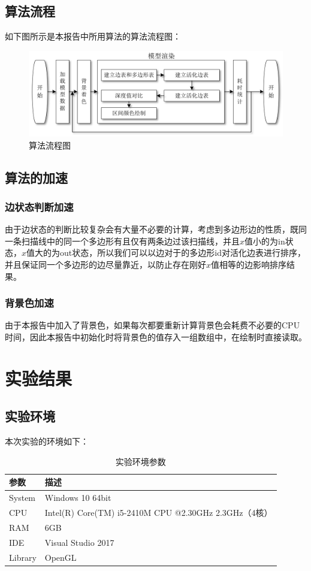 \documentclass[10pt]{article}
\begin{document}
\subsection{算法流程}
如下图所示是本报告中所用算法的算法流程图：
\begin{figure}[H]
\begin{center}
\includegraphics[scale=0.3]{algorithm_chart_flow.png}
\caption{算法流程图}
\end{center}
\end{figure}
\subsection{算法的加速}
\subsubsection{边状态判断加速}
由于边状态的判断比较复杂会有大量不必要的计算，考虑到多边形边的性质，既同一条扫描线中的同一个多边形有且仅有两条边过该扫描线，并且$x$值小的为in状态，$x$值大的为out状态，所以我们可以以边对于的多边形id对活化边表进行排序，并且保证同一个多边形的边尽量靠近，以防止存在刚好$x$值相等的边影响排序结果。

\subsubsection{背景色加速}由于本报告中加入了背景色，如果每次都要重新计算背景色会耗费不必要的CPU时间，因此本报告中初始化时将背景色的值存入一组数组中，在绘制时直接读取。

\section{实验结果}
\subsection{实验环境}
本次实验的环境如下：
\begin{table}[H]
\caption{实验环境参数}
\begin{center}
\begin{tabular}{ll}
\toprule  %
参数& 描述\\
\midrule  %
System& Windows 10 64bit \\
CPU& Intel(R) Core(TM) i5-2410M CPU @2.30GHz 2.3GHz（4核）\\
RAM& 6GB\\
IDE& Visual Studio 2017 \\
Library& OpenGL\\
\bottomrule %
\end{tabular}
\end{center}
\end{table}
\end{document}
